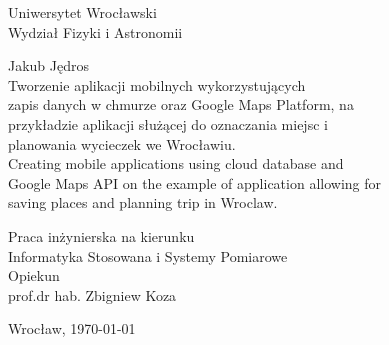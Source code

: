 \documentclass[a4paper,12pt]{article}
\begin{document}
    \begin{center}

    \thispagestyle{empty}

    \Large 
    Uniwersytet Wrocławski\\
    Wydział Fizyki i Astronomii\\
    \vspace{0.8cm}
    \vspace{1.8cm}

    \Large Jakub Jędros \\
    \vspace{3.2cm}
    \Large 
        Tworzenie aplikacji mobilnych wykorzystujących \\
        zapis danych w chmurze oraz Google Maps Platform, na \\ 
        przykładzie aplikacji służącej do oznaczania miejsc i \\
        planowania wycieczek we Wrocławiu. \\
    \vspace{1.5cm}
    \large
        Creating mobile applications using cloud database and \\
        Google Maps API on the example of application allowing for \\
        saving places and planning trip in Wroclaw. \\

    \end{center}
    \vspace{3.7cm}
    \begin{flushright}
    \large{ Praca inżynierska na kierunku \\Informatyka Stosowana i Systemy Pomiarowe \\}
    \vspace{0.5cm}
    \large{ Opiekun \\ prof.\@ dr hab. Zbigniew Koza}
    \end{flushright}
    \vspace{1.6cm}

    \begin{center}
    \large Wrocław, \today
    \end{center}


\newpage

    \tableofcontents


















\newpage
    \printbibliography[]
\end{document}
